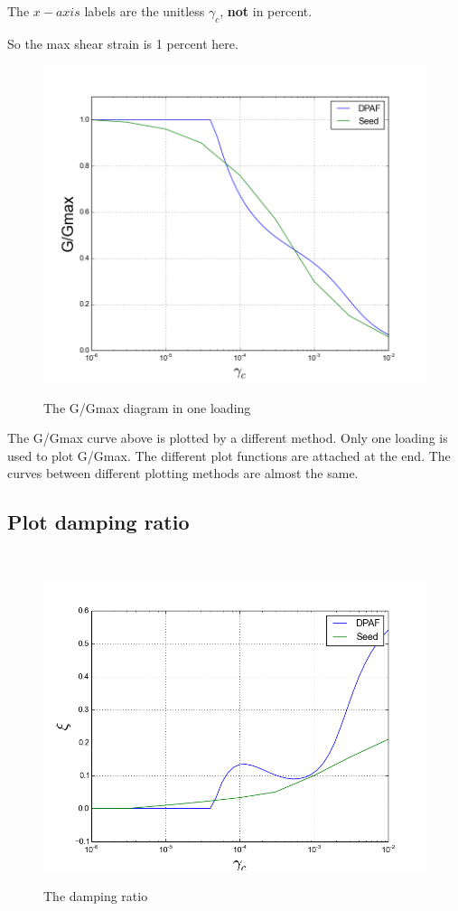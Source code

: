 \documentclass[fleqn,11pt]{article}
\begin{document}
The $x-axis$ labels are the unitless $\gamma_c$, \textbf{not} in percent.

So the max shear strain is 1 percent here.

\begin{figure}[H]
  \caption{The G/Gmax diagram in one loading}
  \centering
    \includegraphics[width=17cm]{../Figure-files/G_Gmax_plot_one_loading.png}
    \label{fig:G_Gmax_1loading}
\end{figure}


The G/Gmax curve above is plotted by a different method. Only one loading is used to plot G/Gmax. The different plot functions are attached at the end. The curves between different plotting methods are almost the same. 


\newpage
\subsection{Plot damping ratio} ~

\begin{figure}[H]
  \caption{The damping ratio}
  \centering
    \includegraphics[width=17cm]{../Figure-files/G_damping_ratio.png}
    \label{fig:damping}
\end{figure}
\end{document}
